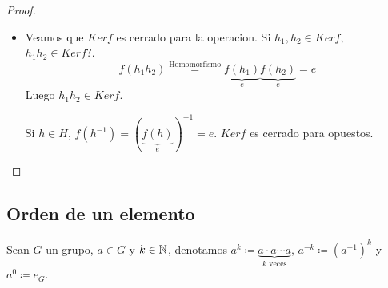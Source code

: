 \begin{proof}
	\begin{itemize}
		\item Veamos que \(Kerf \) es cerrado para la operacion. Si \(h_1, h_2 \in Kerf \), \(h_1 h_2 \in Kerf? \).
		      \[
			      f(h_1 h_2) \overset{\text{Homomorfismo} }{=} \underbrace{f(h_1)}_e \underbrace{f(h_2)}_e = e
		      \]
		      Luego \(h_1 h_2 \in Kerf \).
		      
		      Si \(h \in  H \), \(f(h^{-1} ) = (\underbrace{f(h)}_e)^{-1} = e \). \(Kerf \) es cerrado para opuestos.
		      
		      
	\end{itemize}
\end{proof}

\subsection{Orden de un elemento}
Sean \(G \) un grupo, \(a \in G \) y \(k \in \mathbb{N} \), denotamos \(a^{k} \coloneqq  \underbrace{a \cdot a \cdots a}_{k \text{ veces} } \), \(a^{-k} \coloneqq  (a^{-1} )^{k } 	 \) y \(a^{0} \coloneqq e_G \).

